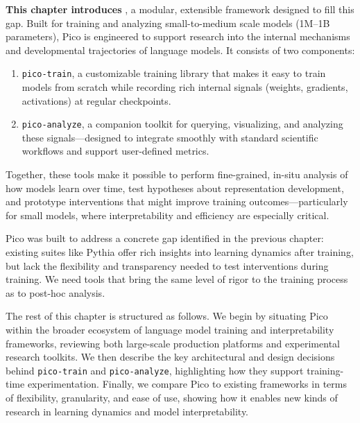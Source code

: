\textbf{This chapter introduces \pico}, a modular, extensible framework designed to fill this gap. Built for training and analyzing small-to-medium scale models (1M--1B parameters), Pico is engineered to support research into the internal mechanisms and developmental trajectories of language models. It consists of two components:

\begin{enumerate}
    \item \texttt{pico-train}, a customizable training library that makes it easy to train models from scratch while recording rich internal signals (weights, gradients, activations) at regular checkpoints.
    \item \texttt{pico-analyze}, a companion toolkit for querying, visualizing, and analyzing these signals—designed to integrate smoothly with standard scientific workflows and support user-defined metrics.
\end{enumerate}

Together, these tools make it possible to perform fine-grained, in-situ analysis of how models learn over time, test hypotheses about representation development, and prototype interventions that might improve training outcomes—particularly for small models, where interpretability and efficiency are especially critical.

Pico was built to address a concrete gap identified in the previous chapter: existing suites like Pythia offer rich insights into learning dynamics after training, but lack the flexibility and transparency needed to test interventions during training. We need tools that bring the same level of rigor to the training process as to post-hoc analysis.

The rest of this chapter is structured as follows. We begin by situating Pico within the broader ecosystem of language model training and interpretability frameworks, reviewing both large-scale production platforms and experimental research toolkits. We then describe the key architectural and design decisions behind \texttt{pico-train} and \texttt{pico-analyze}, highlighting how they support training-time experimentation. Finally, we compare Pico to existing frameworks in terms of flexibility, granularity, and ease of use, showing how it enables new kinds of research in learning dynamics and model interpretability.



